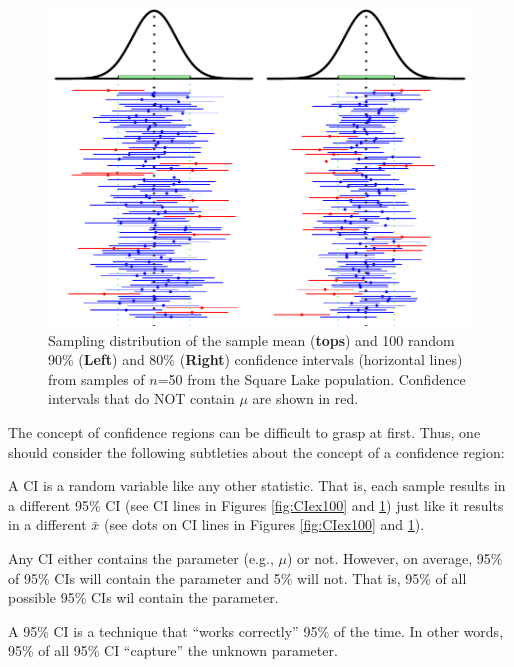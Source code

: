 \documentclass[10pt,openany]{book}\usepackage[]{graphicx}\usepackage[]{color}
\newenvironment{knitrout}{}{} %
\begin{document}
\begin{knitrout}
\color{fgcolor}\begin{figure}[hbtp]

{\centering \includegraphics[width=.92\linewidth]{Figs/CI9080Ex-1} 

}

\caption[Sampling distribution of the sample mean (\textbf{tops}) and 100 random 90\% (\textbf{Left}) and 80\% (\textbf{Right}) confidence intervals (horizontal lines) from samples of $n$=50 from the Square Lake population]{Sampling distribution of the sample mean (\textbf{tops}) and 100 random 90\% (\textbf{Left}) and 80\% (\textbf{Right}) confidence intervals (horizontal lines) from samples of $n$=50 from the Square Lake population. Confidence intervals that do NOT contain $\mu$ are shown in red.}\label{fig:CI9080Ex}
\end{figure}


\end{knitrout}

The concept of confidence regions can be difficult to grasp at first. Thus, one should consider the following subtleties about the concept of a confidence region:

\vspace*{-8pt}
\begin{Itemize}
  \item A CI is a random variable like any other statistic. That is, each sample results in a different 95\% CI (see CI lines in Figures \ref{fig:CIex100} and \ref{fig:CI9080Ex}) just like it results in a different $\bar{x}$ (see dots on CI lines in Figures \ref{fig:CIex100} and \ref{fig:CI9080Ex}).
  \item Any CI either contains the parameter (e.g., $\mu$) or not. However, on average, 95\% of 95\% CIs will contain the parameter and 5\% will not. That is, 95\% of all possible 95\% CIs wil contain the parameter.
  \item A 95\% CI is a technique that ``works correctly'' 95\% of the time. In other words, 95\% of all 95\% CI ``capture'' the unknown parameter.
\end{Itemize}
\end{document}
